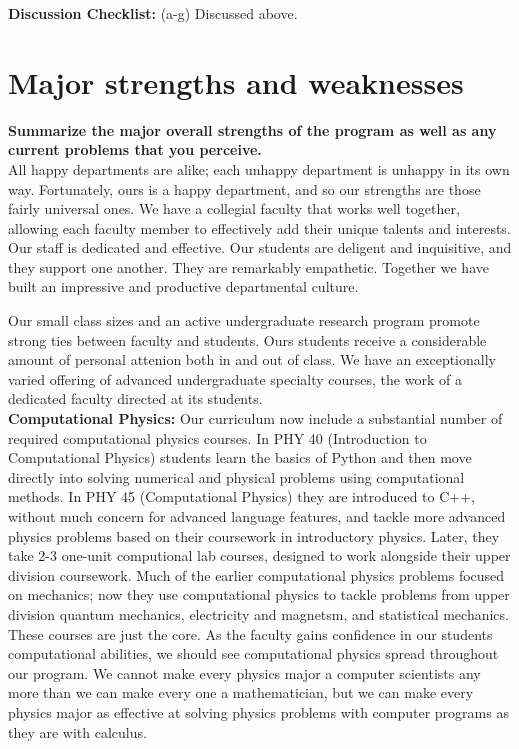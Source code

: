 \documentclass[12pt]{article}
\begin{document}
\noindent
{\bf Discussion Checklist:} (a-g) Discussed above.

\newpage
\section{Major strengths and weaknesses}
\label{sec:snws}

{\bf Summarize the major overall strengths of the program as well as any current problems that you perceive.}\\[3pt]

\noindent
All happy departments are alike; each unhappy department is unhappy in
its own way.  Fortunately, ours is a happy department, and so our
strengths are those fairly universal ones.  We have a collegial
faculty that works well together, allowing each faculty member to
effectively add their unique talents and interests.  Our staff is
dedicated and effective.  Our students are deligent and inquisitive,
and they support one another.  They are remarkably empathetic.
Together we have built an impressive and productive departmental
culture.

Our small class sizes and an active undergraduate research program
promote strong ties between faculty and students.  Ours students
receive a considerable amount of personal attenion both in and out of
class.  We have an exceptionally varied offering of advanced
undergraduate specialty courses, the work of a dedicated faculty
directed at its students.\\[3pt]

\noindent
{\bf Computational Physics:} Our curriculum now include a substantial
number of required computational physics courses.  In PHY 40
(Introduction to Computational Physics) students learn the basics of
Python and then move directly into solving numerical and physical
problems using computational methods.  In PHY 45 (Computational
Physics) they are introduced to C++, without much concern for advanced
language features, and tackle more advanced physics problems based on
their coursework in introductory physics.  Later, they take 2-3
one-unit computional lab courses, designed to work alongside their
upper division coursework.  Much of the earlier computational physics
problems focused on mechanics; now they use computational physics to
tackle problems from upper division quantum mechanics, electricity and
magnetsm, and statistical mechanics. These courses are just the core.
As the faculty gains confidence in our students computational
abilities, we should see computational physics spread throughout our
program.  We cannot make every physics major a computer scientists any
more than we can make every one a mathematician, but we can make every
physics major as effective at solving physics problems with computer
programs as they are with calculus.\\[3pt]
\end{document}
